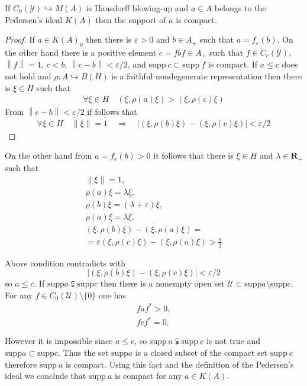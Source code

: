 \documentclass{beamer}
\theoremstyle{plain}
\newcommand{\eps}{\varepsilon}                    %
\newcommand{\supp}{\mathrm{supp}}
\newcommand{\sU}{\mathcal{U}}       %
\newcommand{\sY}{\mathcal{Y}}       %
\newcommand{\la}{\lambda}
\newcommand{\bean}{\begin{eqnarray*}}
\newcommand{\eean}{\end{eqnarray*}}
\newcommand{\hookto}{\hookrightarrow}        %
\begin{document}
\begin{frame}
	\begin{lemma}\label{blowing_pedersen_compact_lem}
		If  $C_0\left( \sY\right)\hookto M\left( A\right)$ is Hausdorff blowing-up and $a\in A$ belongs to the Pedersen's ideal $K\left(A \right)$  then the support of $a$  is compact.
	\end{lemma}
\begin{proof}	
If $a \in K\left(A\right)_0$  then  there is $\eps > 0$ and $b \in A_+$ such that $a = f_\eps \left( b\right)$. On the other hand  there is a positive element  $c= fbf\in  A_+$  such that  $f\in C_c\left(\sY \right)$, $\left\|f \right\|=1 $, $c < b$, $\left\|c - b \right\|  < \eps/2$, and $\supp~ c\subset \supp ~f$ is compact.
If $a \le c$ does not hold and $\rho: A \hookto B\left(H \right)$ is a faithful  nondegenerate representation  then there is $\xi \in H$ such that
\bean\label{blowing_ac_eqn}
\forall \xi \in H \quad \left( \xi, \rho\left( a \right) \xi\right) > \left( \xi, \rho\left( c \right) \xi\right)
\eean
From $\left\|c - b \right\|  < \eps/2$ if follows that
\bean
\forall \xi \in H  \quad \left\| \xi \right\| = 1\quad \Rightarrow\quad  \left|\left( \xi, \rho\left( b \right) \xi\right)-\left( \xi, \rho\left( c \right) \xi\right) \right| < \eps/2
\eean
\end{proof}

\end{frame}
\begin{frame}
On the other hand from $a =f_\eps \left( b\right)> 0$ it follows that there is $\xi \in H$ and $\la \in \mathbf{R}_+$ such that
\bean
\left\| \xi \right\| = 1,\\
\rho\left(a \right) \xi = \la \xi,\\
\rho\left(b \right)\xi = \left( \la+\eps \right) \xi,\\
\rho\left(a \right)\xi = \la  \xi,\\
\left( \xi, \rho\left( b \right) \xi\right) - \left( \xi, \rho\left( a \right) \xi\right)= \\=\eps
\left( \xi, \rho\left( c \right) \xi\right)- \left( \xi, \rho\left( a \right) \xi\right)> \frac{\eps}{2}
\eean

Above condition contradicts with
$$
\left|\left( \xi, \rho\left( b \right) \xi\right)-\left( \xi, \rho\left( c \right) \xi\right) \right| < \eps/2
$$
so $a \le c$.
If $\supp a \subsetneqq \supp c$ then there is a nonempty  open set  $\sU \subset \supp a\setminus \supp c$. For any $f \in C_0\left(\sU \right)\setminus \{0\}$ one has
\bean
faf^* > 0,\\
fcf^* = 0.
\eean
\end{frame}
\begin{frame}
However it is impossible since $a \le c$, so $\supp~ a \subsetneqq \supp ~c$ is not true and $\supp a \subset\supp c$. Thus the set $\supp a$ is a closed subset of the compact set $\supp~ c$ therefore $\supp~ a$ is compact. Using this fact and the definition of the Pedersen's ideal we conclude that $\supp~ a$ is compact for any $a \in K\left( A\right)$. 
	
	
\end{frame}
\end{document}
